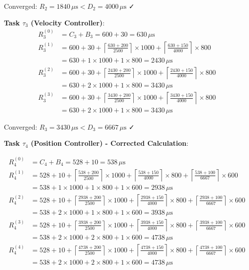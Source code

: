 \documentclass[11pt,a4paper]{article}
\theoremstyle{definition}
\theoremstyle{remark}
\begin{document}
Converged: $R_2 = 1840\,\mu\text{s} < D_2 = 4000\,\mu\text{s}$ ✓

\textbf{Task $\tau_3$ (Velocity Controller)}:
\begin{align}
R_3^{(0)} &= C_3 + B_3 = 600 + 30 = 630\,\mu\text{s} \\
R_3^{(1)} &= 600 + 30 + \left\lceil \frac{630 + 200}{2500} \right\rceil \times 1000 + \left\lceil \frac{630 + 150}{4000} \right\rceil \times 800 \\
&= 630 + 1 \times 1000 + 1 \times 800 = 2430\,\mu\text{s} \\
R_3^{(2)} &= 600 + 30 + \left\lceil \frac{2430 + 200}{2500} \right\rceil \times 1000 + \left\lceil \frac{2430 + 150}{4000} \right\rceil \times 800 \\
&= 630 + 2 \times 1000 + 1 \times 800 = 3430\,\mu\text{s} \\
R_3^{(3)} &= 600 + 30 + \left\lceil \frac{3430 + 200}{2500} \right\rceil \times 1000 + \left\lceil \frac{3430 + 150}{4000} \right\rceil \times 800 \\
&= 630 + 2 \times 1000 + 1 \times 800 = 3430\,\mu\text{s}
\end{align}

Converged: $R_3 = 3430\,\mu\text{s} < D_3 = 6667\,\mu\text{s}$ ✓

\textbf{Task $\tau_4$ (Position Controller) - Corrected Calculation}:

\begin{align}
R_4^{(0)} &= C_4 + B_4 = 528 + 10 = 538\,\mu\text{s} \\
R_4^{(1)} &= 528 + 10 + \left\lceil \frac{538 + 200}{2500} \right\rceil \times 1000 + \left\lceil \frac{538 + 150}{4000} \right\rceil \times 800 + \left\lceil \frac{538 + 100}{6667} \right\rceil \times 600 \\
&= 538 + 1 \times 1000 + 1 \times 800 + 1 \times 600 = 2938\,\mu\text{s} \\
R_4^{(2)} &= 528 + 10 + \left\lceil \frac{2938 + 200}{2500} \right\rceil \times 1000 + \left\lceil \frac{2938 + 150}{4000} \right\rceil \times 800 + \left\lceil \frac{2938 + 100}{6667} \right\rceil \times 600 \\
&= 538 + 2 \times 1000 + 1 \times 800 + 1 \times 600 = 3938\,\mu\text{s} \\
R_4^{(3)} &= 528 + 10 + \left\lceil \frac{3938 + 200}{2500} \right\rceil \times 1000 + \left\lceil \frac{3938 + 150}{4000} \right\rceil \times 800 + \left\lceil \frac{3938 + 100}{6667} \right\rceil \times 600 \\
&= 538 + 2 \times 1000 + 2 \times 800 + 1 \times 600 = 4738\,\mu\text{s} \\
R_4^{(4)} &= 528 + 10 + \left\lceil \frac{4738 + 200}{2500} \right\rceil \times 1000 + \left\lceil \frac{4738 + 150}{4000} \right\rceil \times 800 + \left\lceil \frac{4738 + 100}{6667} \right\rceil \times 600 \\
&= 538 + 2 \times 1000 + 2 \times 800 + 1 \times 600 = 4738\,\mu\text{s}
\end{align}
\end{document}
